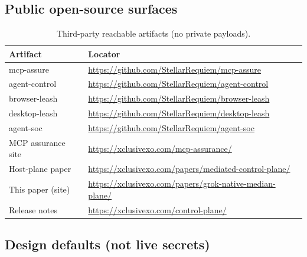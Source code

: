 \documentclass[11pt,a4paper]{article}
\begin{document}
\subsection{Public open-source surfaces}

\begin{table}[h]
\centering
\small
\begin{tabularx}{\textwidth}{@{}lX@{}}
\toprule
\textbf{Artifact} & \textbf{Locator} \\
\midrule
mcp-assure & \url{https://github.com/StellarRequiem/mcp-assure} \\
agent-control & \url{https://github.com/StellarRequiem/agent-control} \\
browser-leash & \url{https://github.com/StellarRequiem/browser-leash} \\
desktop-leash & \url{https://github.com/StellarRequiem/desktop-leash} \\
agent-soc & \url{https://github.com/StellarRequiem/agent-soc} \\
MCP assurance site & \url{https://xclusivexo.com/mcp-assurance/} \\
Host-plane paper & \url{https://xclusivexo.com/papers/mediated-control-plane/} \\
This paper (site) & \url{https://xclusivexo.com/papers/grok-native-median-plane/} \\
Release notes & \url{https://xclusivexo.com/control-plane/} \\
\bottomrule
\end{tabularx}
\caption{Third-party reachable artifacts (no private payloads).}
\label{tab:artifacts}
\end{table}

\subsection{Design defaults (not live secrets)}
\end{document}
